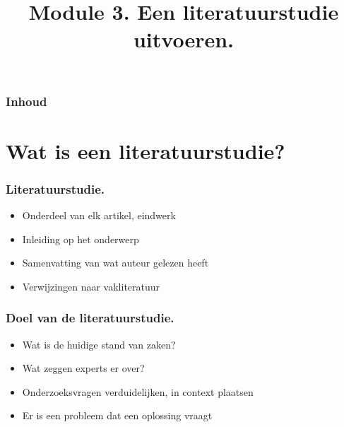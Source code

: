 \documentclass[aspectratio=169]{beamer}
\title{Module 3. Een literatuurstudie uitvoeren.}
\subtitle{\coursename}
\author{\lecturers}   %
\date{\academicyear}
\begin{document}
\begin{frame}
  \maketitle
\end{frame}

\begin{frame}
  \frametitle{Inhoud}

  \tableofcontents
\end{frame}


\section{Wat is een literatuurstudie?}

\begin{frame}
  \frametitle{Literatuurstudie.}

  \begin{itemize}
    \item Onderdeel van elk artikel, eindwerk
    \item Inleiding op het onderwerp
    \item Samenvatting van wat auteur gelezen heeft
    \item Verwijzingen naar vakliteratuur
  \end{itemize}

  \bigskip

\end{frame}

\begin{frame}
  \frametitle{Doel van de literatuurstudie.}

  \begin{itemize}
    \item Wat is de huidige stand van zaken?
    \item Wat zeggen experts er over?
    \item Onderzoeksvragen verduidelijken, in context plaatsen
    \item Er is een probleem dat een oplossing vraagt
  \end{itemize}

  \bigskip

\end{frame}
\end{document}
